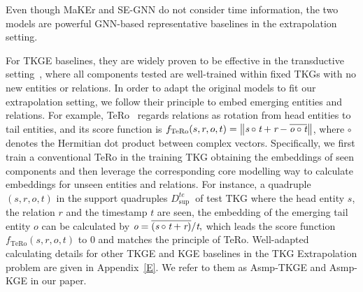 \documentclass[sigconf]{acmart}
\begin{document}
Even though MaKEr and SE-GNN do not consider time information, the two models are powerful GNN-based representative baselines in the extrapolation setting. 
\par
For TKGE baselines, they are widely proven to be effective in the transductive setting~\citep{Wang2014KnowledgeGE,Lin2015LearningEA, Feng2016KnowledgeGE, balazevic-etal-2019-tucker,Kazemi2018SimplEEF,Qian2018TranslatingEF}, where all components tested are well-trained within fixed TKGs with no new entities or relations. In order to adapt the original models to fit our extrapolation setting, we follow their principle to embed emerging entities and relations. 
For example, TeRo~\citep{TeRo} regards relations as rotation from head entities to tail entities, and its score function is $f_{\mathrm{TeRo}}(s, r, o, t)=\left\|\emph{s} \circ \emph{t}+\emph{r}-\overline{\emph{o} \circ \emph{t}}\right\|$, where $\circ$ denotes the Hermitian dot product between complex vectors.
Specifically, we first train a conventional TeRo in the training TKG obtaining the embeddings of seen components and then leverage the corresponding core modelling way to calculate embeddings for unseen entities and relations. 
For instance,  a quadruple $\left(s, r, o, t\right)$ in the support quadruples $ {D}_{\text {sup }}^{t e}$ of test TKG where the head entity $s$, the relation $r$ and the timestamp $t$ are seen, the embedding of the emerging tail entity $o$  can be calculated by $\emph{o} = \overline{(\emph{s} \circ \emph{t} + \emph{r})} / \emph{t}, $ which leads the score function $f_{\mathrm{TeRo}}(s, r, o, t)$ to 0 and matches the principle of TeRo. Well-adapted calculating details for other TKGE and KGE baselines in the TKG Extrapolation problem are given in Appendix~\ref{E}. We refer to them as Asmp-TKGE and Asmp-KGE in our paper. 
\end{document}
